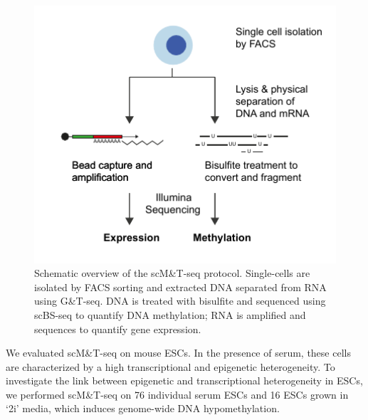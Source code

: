 \begin{figure}[htbp!]
  \begin{minipage}[c]{0.65\textwidth}
    \centering
    \includegraphics[width=1.0\textwidth]{proto}
  \end{minipage}
  \begin{minipage}[c]{0.32\textwidth}
    \caption[Schematic overview of the scM\&T-seq protocol.]{Schematic overview of the scM\&T-seq protocol. Single-cells are isolated by FACS sorting and extracted DNA separated from RNA using G\&T-seq. DNA is treated with bisulfite and sequenced using scBS-seq to quantify DNA methylation; RNA is amplified and sequences to quantify gene expression.}
    \label{fig:mt_proto}
  \end{minipage}
\end{figure}

We evaluated scM\&T-seq on mouse ESCs. In the presence of serum, these cells are characterized by a high transcriptional and epigenetic heterogeneity. To investigate the link between epigenetic and transcriptional heterogeneity in ESCs, we performed scM\&T-seq on 76 individual serum ESCs and 16 ESCs grown in `2i' media, which induces genome-wide DNA hypomethylation.

